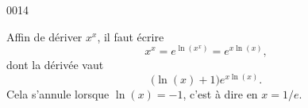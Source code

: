 \begin{corrige}{0014}

Affin de dériver $x^x$, il faut écrire
\begin{equation}
	x^x= e^{\ln(x^x)}= e^{x\ln(x)},
\end{equation}
dont la dérivée vaut
\begin{equation}
	\big( \ln(x)+1 \big) e^{x\ln(x)}.
\end{equation}
Cela s'annule lorsque $\ln(x)=-1$, c'est à dire en $x=1/e$.

\end{corrige}
